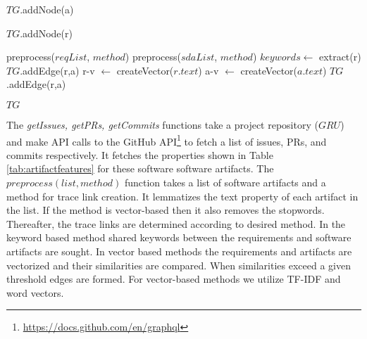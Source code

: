 \begin{breakablealgorithm}
\begin{algorithmic}[1]
 \label{algl:c}
\State $TG$.addNode(a)
\EndFor \label{algl:c}

 \label{algl:c}
\State $TG$.addNode(r)
\EndFor \label{algl:c}


\State preprocess($reqList$, $method$)
\State preprocess($sdaList$, $method$)
\State $keywords \leftarrow$ extract(r)
\State $TG$.addEdge(r,a)
\EndIf
\EndIf
{}
\State r-v $\leftarrow$ createVector($r.text$)
\State a-v $\leftarrow$ createVector($a.text$)
\State $TG$.addEdge(r,a)
\EndIf
\EndIf
\EndFor
\EndFor

\Return $TG$
\end{algorithmic}

\end{breakablealgorithm}

The \textit{getIssues, getPRs, getCommits} functions take a project repository  ($GRU$) and make API calls to the GitHub API\footnote{\url{https://docs.github.com/en/graphql}} to fetch a list of issues, PRs, and commits respectively. 
It fetches the properties shown in Table \ref{tab:artifactfeatures} for these software software artifacts. 
The \textit{$preprocess(list, method)$}  function takes  a list of software artifacts and a method for trace link creation. 
It lemmatizes the text property of each artifact in the list. 
If the method is vector-based then it also removes the stopwords. 
Thereafter, the trace links are determined according to desired method.
In the keyword based method shared keywords between the requirements and software artifacts are sought. In vector based methods the requirements and artifacts are vectorized and their similarities are compared. When similarities exceed a given threshold edges are formed.
For vector-based methods we utilize TF-IDF and word vectors.


